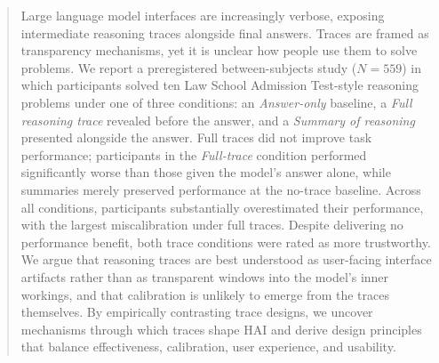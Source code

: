 \documentclass[acmlarge,review=true, anonymous=true]{acmart}
\let\xtodo\todo
\renewcommand{\todo}[1]{\xtodo[inline,color=green!50]{#1}}
\begin{document}
\begin{abstract}

Large language model interfaces are increasingly verbose, exposing intermediate reasoning traces alongside final answers. Traces are framed as transparency mechanisms, yet it is unclear how people use them to solve problems.  We report a preregistered between-subjects study ($N=559$) in which participants solved ten Law School Admission Test-style reasoning problems under one of three conditions: an \textit{Answer-only} baseline, a \textit{Full reasoning trace} revealed before the answer, and a \textit{Summary of reasoning} presented alongside the answer. Full traces did not improve task performance; participants in the \textit{Full-trace} condition performed significantly worse than those given the model's answer alone, while summaries merely preserved performance at the no-trace baseline. Across all conditions, participants substantially overestimated their performance, with the largest miscalibration under full traces. Despite delivering no performance benefit, both trace conditions were rated as more trustworthy. We argue that reasoning traces are best understood as user-facing interface artifacts rather than as transparent windows into the model's inner workings, and that calibration is unlikely to emerge from the traces themselves. By empirically contrasting trace designs, we uncover mechanisms through which traces shape HAI and derive design principles that balance effectiveness, calibration, user experience, and usability.



\end{abstract}
\end{document}
